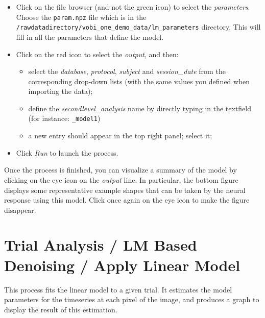 \begin{itemize}
  \item Click on the file browser (and not the green icon) to select the \textit{parameters}. Choose the \texttt{param.npz} file which is in the \texttt{/rawdatadirectory/vobi\_one\_demo\_data/lm\_parameters} directory. This will fill in all the parameters that define the model.
  \item Click on the red icon to select the \textit{output}, and then:
    \begin{itemize}
      \item select the \textit{database}, \textit{protocol}, \textit{subject} and \textit{session\_date} from the corresponding drop-down lists (with the same values you defined when importing the data);
      \item define the \textit{secondlevel\_analysis} name by directly typing in the textfield (for instance: \texttt{\_model1})
      \item a new entry should appear in the top right panel; select it;
    \end{itemize}
  \item Click \textit{Run} to launch the process.
\end{itemize}

Once the process is finished, you can visualize a summary of the model by clicking on the eye icon on the \textit{output} line. In particular, the bottom figure displays some representative example shapes that can be taken by the neural response using this model. Click once again on the eye icon to make the figure disappear.

\section{Trial Analysis / LM Based Denoising / Apply Linear Model}

This process fits the linear model to a given trial. It estimates the model parameters for the timeseries at each pixel of the image, and produces a graph to display the result of this estimation.

